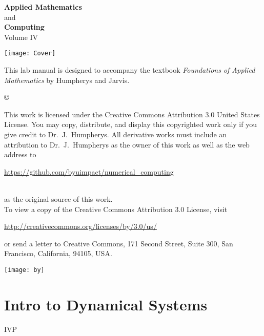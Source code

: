 \documentclass[nociteref]{SIAM-GH-book}
\begin{document}
\thispagestyle{empty}
\begin{center}
{\huge \bf Applied Mathematics} \\ and \\ {\huge \bf Computing} \\
\vspace{5mm}
{\Large Volume IV}
\vspace{20mm}

\texttt{[image: Cover]}
\end{center}
\frontmatter




\begin{thepreface}
This lab manual is designed to accompany the textbook \emph{Foundations of Applied Mathematics} by Humpherys and Jarvis.

\vfill
\copyright{This work is licensed under the Creative Commons Attribution 3.0 United States 
License.  You may copy, distribute, and display this copyrighted work only if you give 
credit to Dr.~J.~Humpherys. All derivative works must include an attribution to Dr.~J.~Humpherys as the owner of this work as well as the web address to 
\\\centerline{\url{https://github.com/byuimpact/numerical_computing}}\\ as the original source of 
this 
work.\\To view a copy of the Creative Commons Attribution 3.0 License, 
visit\\\centerline{\url{http://creativecommons.org/licenses/by/3.0/us/}} or send a letter to 
Creative Commons, 171 Second Street, Suite 300, San Francisco, California, 94105, USA.}

\vfill
\centering\texttt{[image: by]}
\vfill
\end{thepreface}

\setcounter{tocdepth}{1}
\tableofcontents

\mainmatter

\part{Intro to Dynamical Systems}
{IVP}
\end{document}

